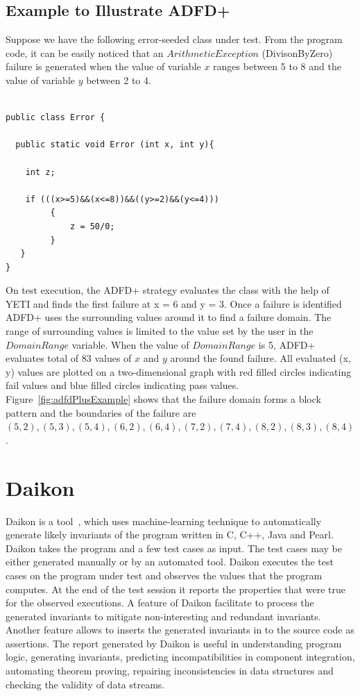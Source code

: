 \subsection{Example to Illustrate ADFD+}\label{sec:intro6_5}
Suppose we have the following error-seeded class under test. From the program code, it can be easily noticed that an $ArithmeticException$ (DivisonByZero) failure is generated when the value of variable $x$ ranges between 5 to 8 and the value of variable $y$ between 2 to 4.

\begin{lstlisting}

public class Error {

  public static void Error (int x, int y){

    int z;

    if (((x>=5)&&(x<=8))&&((y>=2)&&(y<=4)))
		 {
			 z = 50/0;
		 }
   } 
}
\end{lstlisting}

On test execution, the ADFD+ strategy evaluates the class with the help of YETI and finds the first failure at x = 6 and y = 3. Once a failure is identified ADFD+ uses the surrounding values around it to find a failure domain. The range of surrounding values is limited to the value set by the user in the $Domain Range$ variable. When the value of $Domain Range$ is 5, ADFD+ evaluates total of 83 values of $x$ and $y$ around the found failure. All evaluated (x, y) values are plotted on a two-dimensional graph with red filled circles indicating fail values and blue filled circles indicating pass values. Figure~\ref{fig:adfdPlusExample} shows that the failure domain forms a block pattern and the boundaries of the failure are $(5, 2), (5, 3),(5, 4), (6, 2), (6, 4), (7, 2), (7, 4), (8, 2), (8, 3), (8, 4)$. 






\section{Daikon}\label{sec:intro6_6}
Daikon is a tool~\cite{ernst2007daikon}, which uses machine-learning technique to automatically generate likely invariants of the program written in C, C++, Java and Pearl. Daikon takes the program and a few test cases as input. The test cases may be either generated manually or by an automated tool. Daikon executes the test cases on the program under test and observes the values that the program computes. At the end of the test session it reports the properties that were true for the observed executions. A feature of Daikon facilitate to process the generated invariants to mitigate non-interesting and redundant invariants. Another feature allows to inserts the generated invariants in to the source code as assertions. The report generated by Daikon is useful in understanding program logic, generating invariants, predicting incompatibilities in component integration, automating theorem proving, repairing inconsistencies in data structures and checking the validity of data streams.




